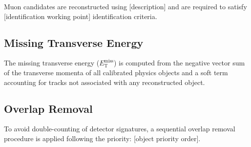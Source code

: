 Muon candidates are reconstructed using [description] and are required
to satisfy [identification working point] identification criteria.

\subsection{Missing Transverse Energy}
\label{sec:objects:met}


The missing transverse energy ($E_\text{T}^\text{miss}$) is computed
from the negative vector sum of the transverse momenta of all calibrated
physics objects and a soft term accounting for tracks not associated with
any reconstructed object.

\subsection{Overlap Removal}
\label{sec:objects:overlap}


To avoid double-counting of detector signatures, a sequential overlap
removal procedure is applied following the priority: [object priority order].
